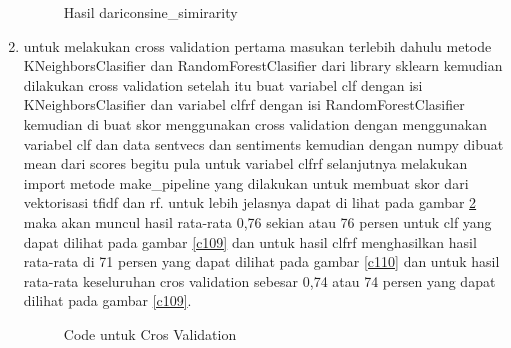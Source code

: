 \begin{enumerate}
\begin{figure}[!htbp]
      \caption{Hasil dariconsine\_simirarity}
      \label{c107}
      \end{figure}

\item untuk melakukan cross validation pertama masukan terlebih dahulu metode KNeighborsClasifier dan RandomForestClasifier dari library sklearn kemudian dilakukan cross validation setelah itu buat variabel clf dengan isi KNeighborsClasifier dan variabel clfrf dengan isi RandomForestClasifier kemudian di buat skor menggunakan cross validation dengan menggunakan variabel clf dan data sentvecs dan sentiments kemudian dengan numpy dibuat mean dari scores begitu pula untuk variabel clfrf selanjutnya melakukan import metode make\_pipeline yang dilakukan untuk membuat skor dari vektorisasi tfidf dan rf. untuk lebih jelasnya dapat di lihat pada gambar \ref{c108}  maka akan muncul hasil rata-rata 0,76 sekian atau 76 persen untuk clf yang dapat dilihat pada gambar \ref{c109} dan untuk hasil clfrf menghasilkan hasil rata-rata di 71 persen yang dapat dilihat pada gambar \ref{c110} dan untuk hasil rata-rata keseluruhan cros validation sebesar 0,74 atau 74 persen yang dapat dilihat pada gambar \ref{c109}.

\begin{figure}[!htbp]
      \caption{Code untuk Cros Validation}
      \label{c108}
      \end{figure}


\end{enumerate}
